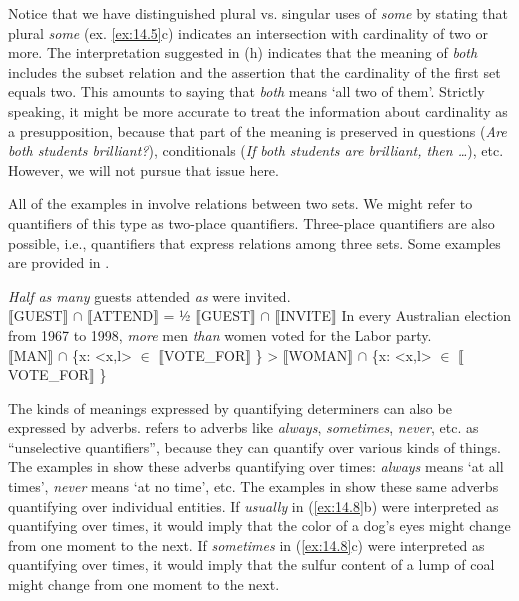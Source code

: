Notice that we have distinguished plural vs. singular uses of \textit{some} by stating that plural \textit{some} (ex. \ref{ex:14.5}c) indicates an intersection with cardinality of two or more. The interpretation suggested in (h) indicates that the meaning of \textit{both} includes the subset relation and the assertion that the cardinality of the first set equals two. This amounts to saying that \textit{both} means ‘all two of them’. Strictly speaking, it might be more accurate to treat the information about cardinality as a presupposition, because that part of the meaning is preserved in questions (\textit{Are} \textit{both students brilliant?}), conditionals (\textit{If} \textit{both students are brilliant, then …}), etc. However, we will not pursue that issue here.



All of the examples in  involve relations between two sets. We might refer to quantifiers of this type as two-place quantifiers. Three-place quantifiers are also possible, i.e., quantifiers that express relations among three sets. Some examples are provided in .


\ea \label{ex:14.6}
\ea  \textit{Half as many} guests attended \textit{as} were invited.\\
\textsc{{\textbar}} \textsc{$\llbracket$}GUEST$\rrbracket$  ${\cap}$ \textsc{$\llbracket$}ATTEND$\rrbracket$  {\textbar}  =  ½\textsc{{\textbar}} \textsc{$\llbracket$}GUEST$\rrbracket$  ${\cap}$ \textsc{$\llbracket$}INVITE$\rrbracket$  {\textbar}
\ex In every Australian election from 1967 to 1998, \textit{more} men \textit{than} women voted for the Labor party.\\
{\textbar} \textsc{$\llbracket$}MAN$\rrbracket$  ${\cap}$ \{x: <x,l> ${\in}$ $\llbracket$VOTE\_FOR$\rrbracket$ \}{\textbar}  >  {\textbar} \textsc{$\llbracket$WO}MAN$\rrbracket$  ${\cap}$ \{x: <x,l> ${\in}$ $\llbracket$VOTE\_FOR$\rrbracket$ \}{\textbar}
\z \z


The kinds of meanings expressed by quantifying determiners can also be expressed by adverbs. \citet{Lewis1975} refers to adverbs like \textit{always}, \textit{sometimes}, \textit{never}, etc. as “unselective quantifiers”, because they can quantify over various kinds of things. The examples in  show these adverbs quantifying over times: \textit{always} means ‘at all times’, \textit{never} means ‘at no time’, etc. The examples in  show these same adverbs quantifying over individual entities. If \textit{usually} in (\ref{ex:14.8}b) were interpreted as quantifying over times, it would imply that the color of a dog’s eyes might change from one moment to the next. If \textit{sometimes} in (\ref{ex:14.8}c) were interpreted as quantifying over times, it would imply that the sulfur content of a lump of coal might change from one moment to the next.


